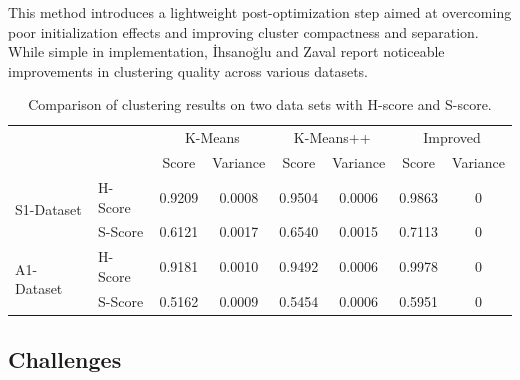 \documentclass[10pt,twocolumn,letterpaper]{article}
\begin{document}
This method introduces a lightweight post-optimization step aimed at overcoming
poor initialization effects and improving cluster compactness and separation.
While simple in implementation, İhsanoğlu and Zaval report noticeable
improvements in clustering quality across various datasets.

\begin{table}
    \centering
    \begin{tabular}{ll c c c c c c}
        \toprule
                                    &         & \multicolumn{2}{c}{K-Means} & \multicolumn{2}{c}{K-Means++} & \multicolumn{2}{c}{Improved}                                \\
        \cmidrule(lr){3-4} \cmidrule(lr){5-6} \cmidrule(lr){7-8}
                                    &         & Score                       & Variance                      & Score                        & Variance & Score  & Variance \\
        \midrule
        \multirow{2}{*}{S1-Dataset} & H-Score & 0.9209                      & 0.0008                        & 0.9504                       & 0.0006   & 0.9863 & 0        \\
                                    & S-Score & 0.6121                      & 0.0017                        & 0.6540                       & 0.0015   & 0.7113 & 0        \\
        \midrule
        \multirow{2}{*}{A1-Dataset} & H-Score & 0.9181                      & 0.0010                        & 0.9492                       & 0.0006   & 0.9978 & 0        \\
                                    & S-Score & 0.5162                      & 0.0009                        & 0.5454                       & 0.0006   & 0.5951 & 0        \\
        \bottomrule
    \end{tabular}
    \vspace{5pt}
    \caption{Comparison of clustering results on two data sets with H-score and S-score.}
    \label{tab:clustering_comparison2}
\end{table}


\subsection{Challenges}\label{subsec:challenges}
\end{document}
